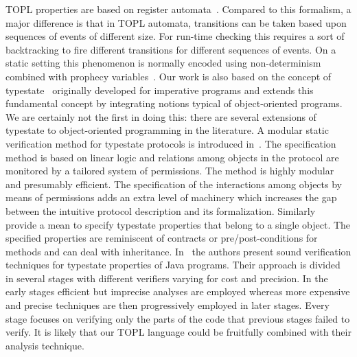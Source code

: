 \documentclass[10pt, preprint]{sigplanconf} %
\begin{document}
TOPL properties are based on register automata~\cite{dblp:journals/tocl/demril09}.
Compared to this formalism, a major difference is that in TOPL automata, transitions can be taken based upon sequences of events of different size.
For run-time checking this requires a sort of backtracking to fire different transitions for different  sequences of events.
On a static setting this phenomenon is normally encoded using non-determinism combined with prophecy variables~\cite{dblp:journals/tcs/abadil91}.
Our work is also based on the concept of typestate~\cite{strom1986} originally developed for imperative programs and extends this fundamental concept by integrating notions typical of object-oriented programs.
We are certainly not the first in doing this: there are several extensions of typestate to object-oriented programming in the literature.
A modular static verification method for typestate protocols is introduced in~\cite{dblp:conf/oopsla/bierhoffa07}.
The specification method is based on linear logic and relations among objects in the protocol are monitored by a tailored system of permissions.
The method is highly modular and presumably efficient.
The specification of the interactions among objects by means of permissions adds an extra level of machinery which increases the gap between the intuitive protocol description and its formalization.
Similarly~\cite{deline2004,dblp:conf/sigsoft/BierhoffA05} provide a mean to specify typestate properties that belong to a single object.
The specified properties are reminiscent of contracts or pre/post-conditions for methods and can deal with inheritance.
In~\cite{dblp:conf/issta/FinkYDRG06} the authors present sound verification techniques for typestate properties of Java  programs.
Their approach is divided in several stages with different verifiers varying for cost and precision.
In the early stages efficient but imprecise analyses are employed whereas more expensive and precise techniques are then progressively employed in later stages.
Every stage focuses on verifying only the parts of the code that previous stages failed to verify.
It is likely that our TOPL language could be fruitfully combined with their analysis technique.
\end{document}
